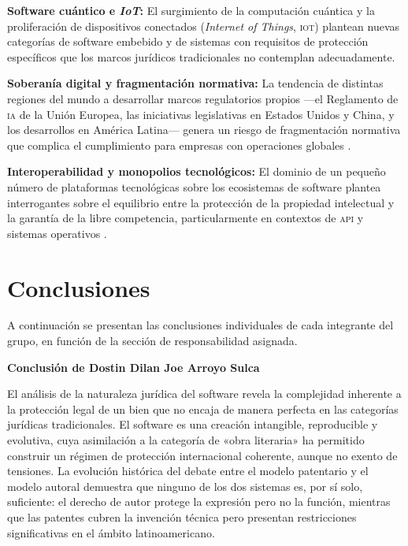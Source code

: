 \documentclass[11pt,a4paper]{report}
\begin{document}
\textbf{Software cuántico e \textit{IoT}:} El surgimiento de la computación cuántica y la proliferación de dispositivos conectados (\textit{Internet of Things}, \textsc{iot}) plantean nuevas categorías de software embebido y de sistemas con requisitos de protección específicos que los marcos jurídicos tradicionales no contemplan adecuadamente.

\textbf{Soberanía digital y fragmentación normativa:} La tendencia de distintas regiones del mundo a desarrollar marcos regulatorios propios —el Reglamento de \textsc{ia} de la Unión Europea, las iniciativas legislativas en Estados Unidos y China, y los desarrollos en América Latina— genera un riesgo de fragmentación normativa que complica el cumplimiento para empresas con operaciones globales \citep{euipo2022, indecopi2023}.

\textbf{Interoperabilidad y monopolios tecnológicos:} El dominio de un pequeño número de plataformas tecnológicas sobre los ecosistemas de software plantea interrogantes sobre el equilibrio entre la protección de la propiedad intelectual y la garantía de la libre competencia, particularmente en contextos de \textsc{api} y sistemas operativos \citep{ompi2024}.

\newpage

\chapter*{Conclusiones}

A continuación se presentan las conclusiones individuales de cada integrante del grupo, en función de la sección de responsabilidad asignada.

\vspace{0.5cm}

\noindent\textbf{Conclusión de Dostin Dilan Joe Arroyo Sulca}

\smallskip

El análisis de la naturaleza jurídica del software revela la complejidad inherente a la protección legal de un bien que no encaja de manera perfecta en las categorías jurídicas tradicionales. El software es una creación intangible, reproducible y evolutiva, cuya asimilación a la categoría de «obra literaria» ha permitido construir un régimen de protección internacional coherente, aunque no exento de tensiones. La evolución histórica del debate entre el modelo patentario y el modelo autoral demuestra que ninguno de los dos sistemas es, por sí solo, suficiente: el derecho de autor protege la expresión pero no la función, mientras que las patentes cubren la invención técnica pero presentan restricciones significativas en el ámbito latinoamericano.
\end{document}
